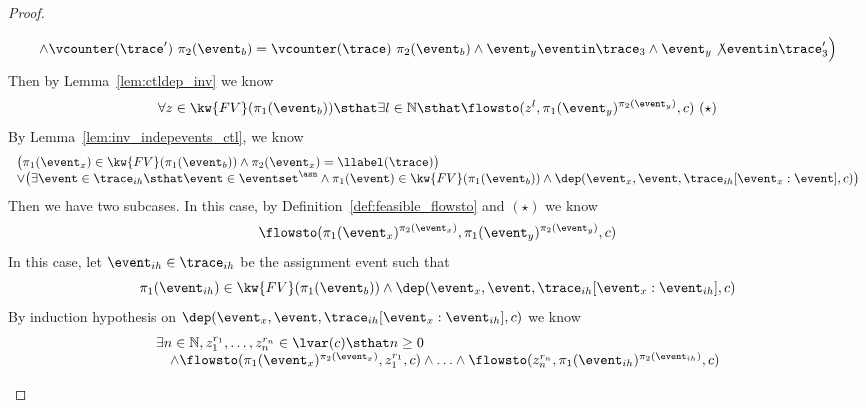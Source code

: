 \begin{proof}
\begin{case}
\[\begin{array}{ll}
             \land \vcounter(\trace') ~  \pi_2(\event_b) = \vcounter(\trace) ~  \pi_2(\event_b)
              \land \event_y \eventin \trace_3
            \land \event_y \not\eventin \trace_3'
           \Big)
         \end{array}
         \]
         Then by Lemma~\ref{lem:ctldep_inv} we know 
         \[
          \forall z \in \kw{FV}(\pi_1(\event_b)) \sthat  
          \exists l \in \mathbb{N} \sthat  
          \flowsto(z^l, \pi_1(\event_y)^{\pi_2(\event_y)},c)~(\star)
        \]
         By Lemma~\ref{lem:inv_indepevents_ctl}, we know
         \[
          \begin{array}{l}
            \big(
              \pi_1(\event_x) \in \kw{FV}(\pi_1(\event_b)) \land {\pi_2(\event_x)} = \llabel(\trace)
            \big)
          \\
          \lor 
          \big(
            \exists \event \in \trace_{ih} \sthat 
            \event \in \eventset^{\asn} \land \pi_1(\event) \in  \kw{FV}(\pi_1(\event_b)) 
          \land \dep(\event_x, \event, \trace_{ih}[\event_x:\event], c)
          \big)
          \end{array}
        \]
          Then we have two subcases.
          In this case, by Definition~\ref{def:feasible_flowsto} and $(\star)$ we know
          \[
            \flowsto(\pi_1(\event_x)^{\pi_2(\event_x)}, \pi_1(\event_y)^{\pi_2(\event_y)}, c)
          \]
          In this case, let $\event_{ih}\in \trace_{ih} $ be the assignment event such that
          \[
            \pi_1(\event_{ih}) \in  \kw{FV}(\pi_1(\event_b)) 
            \land \dep(\event_x, \event, \trace_{ih}[\event_x:\event_{ih}], c)
          \]
          By induction hypothesis on $\dep(\event_x, \event, \trace_{ih}[\event_x:\event_{ih}], c)$ we know
          \[
            \begin{array}{l}
              \exists n \in \mathbb{N}, z_1^{r_1}, \ldots, z_n^{r_n} \in \lvar(c) 
              \sthat  n \geq 0 
              \\ \quad  \land
              \flowsto(\pi_1(\event_x)^{\pi_2(\event_x)},  z_1^{r_1}, c) 
              \land \ldots \land \flowsto(z_n^{r_n}, \pi_1(\event_{ih})^{\pi_2(\event_{ih})}, c) 
            \end{array}
\]
\end{case}
\end{proof}
